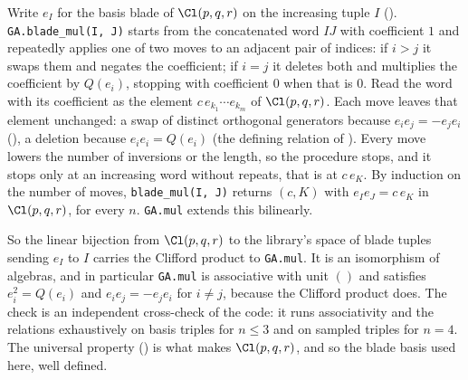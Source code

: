 Write $e_I$ for the basis blade of $\Cl(p, q, r)$ on the increasing tuple $I$ (). \texttt{GA.blade\_mul(I, J)} starts from the concatenated word $I J$ with coefficient $1$ and repeatedly applies one of two moves to an adjacent pair of indices: if $i > j$ it swaps them and negates the coefficient; if $i = j$ it deletes both and multiplies the coefficient by $Q(e_i)$, stopping with coefficient $0$ when that is $0$. Read the word with its coefficient as the element $c\, e_{k_1} \cdots e_{k_m}$ of $\Cl(p, q, r)$. Each move leaves that element unchanged: a swap of distinct orthogonal generators because $e_i e_j = -e_j e_i$ (), a deletion because $e_i e_i = Q(e_i)$ (the defining relation of ). Every move lowers the number of inversions or the length, so the procedure stops, and it stops only at an increasing word without repeats, that is at $c\, e_K$. By induction on the number of moves, \texttt{blade\_mul(I, J)} returns $(c, K)$ with $e_I e_J = c\, e_K$ in $\Cl(p, q, r)$, for every $n$. \texttt{GA.mul} extends this bilinearly.

So the linear bijection from $\Cl(p, q, r)$ to the library's space of blade tuples sending $e_I$ to $I$ carries the Clifford product to \texttt{GA.mul}. It is an isomorphism of algebras, and in particular \texttt{GA.mul} is associative with unit $()$ and satisfies $e_i^{2} = Q(e_i)$ and $e_i e_j = -e_j e_i$ for $i \ne j$, because the Clifford product does. The check is an independent cross-check of the code: it runs associativity and the relations exhaustively on basis triples for $n \le 3$ and on sampled triples for $n = 4$. The universal property () is what makes $\Cl(p, q, r)$, and so the blade basis used here, well defined.
